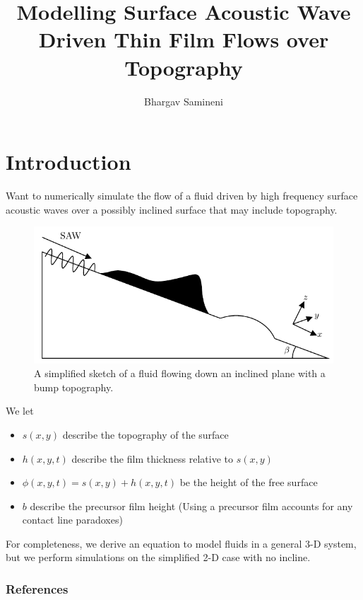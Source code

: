 \documentclass[compress, xcolor=dvipsnames]{beamer}
\title{Modelling Surface Acoustic Wave Driven Thin Film Flows over Topography}
\author{Bhargav Samineni}
\newcommand{\func}[2]{\ensuremath{#1\!\lrp{#2}}}
\newcommand{\lrp}[1]{\left( #1 \right)}
\begin{document}
   
    \frame{\titlepage}     

    \section{Introduction}
    \begin{frame}
        Want to numerically simulate the flow of a fluid driven by 
        high frequency surface acoustic waves over a possibly inclined surface that may include topography. 

        \begin{figure}[hb]
            \centering
            \includegraphics[width=.75\textwidth]{images/samp_diagram.pdf}
            \caption{A simplified sketch of a fluid flowing down an inclined plane with a bump topography.}
            \label{fig:model_diagram}
        \end{figure}
    \end{frame}
    \begin{frame} 
        We let
        \begin{itemize}
            \item $\func{s}{x, y}$ describe the topography of the surface
            \item $\func{h}{x,y,t}$ describe the film thickness relative to $\func{s}{x,y}$ 
            \item $\func{\phi}{x,y,t} = \func{s}{x,y} + \func{h}{x,y,t}$ be the height of the free surface
            \item $b$ describe the precursor film height (Using a precursor film accounts for any contact line paradoxes)
        \end{itemize}

        For completeness, we derive an equation to model fluids in a general
        3-D system, but we perform simulations on the simplified 2-D case with no incline. 
    \end{frame}

    
    
    

    \appendix
    \begin{frame}[plain]
        \frametitle{References}
        \nocite{*}
        \printbibliography
    \end{frame}
\end{document}
